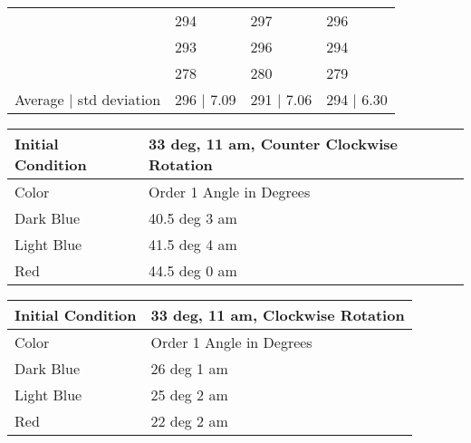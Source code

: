 \documentclass{article}
\begin{document}
\begin{table}[H]
\begin{tabular}{llll}
\multicolumn{1}{l|}{}   & \multicolumn{1}{l|}{294}                   & \multicolumn{1}{l|}{297}                           & \multicolumn{1}{l|}{296}                          \\ \cline{2-4} 
\multicolumn{1}{l|}{}   & \multicolumn{1}{l|}{293}                   & \multicolumn{1}{l|}{296}                           & \multicolumn{1}{l|}{294}                          \\ \cline{2-4} 
\multicolumn{1}{l|}{}   & \multicolumn{1}{l|}{278}                   & \multicolumn{1}{l|}{280}                           & \multicolumn{1}{l|}{279}                          \\ \cline{2-4} 
Average $|$ std deviation & 296 $|$ 7.09                                 & 291 $|$ 7.06                                         & 294 | 6.30                                       
\end{tabular}
\end{table}
\begin{table}[H]
\begin{tabular}{ll}
Initial Condition                & 33 deg, 11 am, Counter Clockwise Rotation     \\ \hline
\multicolumn{1}{|l|}{Color}      & \multicolumn{1}{l|}{Order 1 Angle in Degrees} \\ \hline
\multicolumn{1}{|l|}{Dark Blue}  & \multicolumn{1}{l|}{40.5 deg 3 am}            \\ \hline
\multicolumn{1}{|l|}{Light Blue} & \multicolumn{1}{l|}{41.5 deg 4 am}            \\ \hline
\multicolumn{1}{|l|}{Red}        & \multicolumn{1}{l|}{44.5 deg 0 am}            \\ \hline
\end{tabular}
\end{table}
\begin{table}[H]
\begin{tabular}{ll}
Initial Condition                & 33 deg, 11 am,  Clockwise Rotation            \\ \hline
\multicolumn{1}{|l|}{Color}      & \multicolumn{1}{l|}{Order 1 Angle in Degrees} \\ \hline
\multicolumn{1}{|l|}{Dark Blue}  & \multicolumn{1}{l|}{26 deg 1 am}              \\ \hline
\multicolumn{1}{|l|}{Light Blue} & \multicolumn{1}{l|}{25 deg 2 am}              \\ \hline
\multicolumn{1}{|l|}{Red}        & \multicolumn{1}{l|}{22 deg 2 am}              \\ \hline
\end{tabular}
\end{table}
\end{document}
